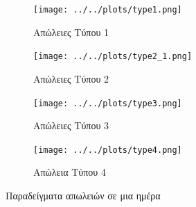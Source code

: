 \begin{figure}[ht!]
\begin{subfigure}[b]{0.5\textwidth}
\texttt{[image: ../../plots/type1.png]}
\caption{Απώλειες Τύπου 1 \label{type1loss}}
\end{subfigure}
\quad
\begin{subfigure}[b]{0.5\textwidth}
\texttt{[image: ../../plots/type2\_1.png]}
\caption{Απώλειες Τύπου 2\label{type2loss}}
\end{subfigure}
\quad
\begin{subfigure}[b]{0.5\textwidth}
\texttt{[image: ../../plots/type3.png]}
\caption{Απώλειες Τύπου 3 \label{type3loss}}
\end{subfigure}
\quad
\begin{subfigure}[b]{0.5\textwidth}
\texttt{[image: ../../plots/type4.png]}
\caption{Απώλεια Τύπου 4 \label{type4loss}}
\end{subfigure}
\caption{Παραδείγματα απωλειών σε μια ημέρα}
\label{losstypes}
\end{figure}

